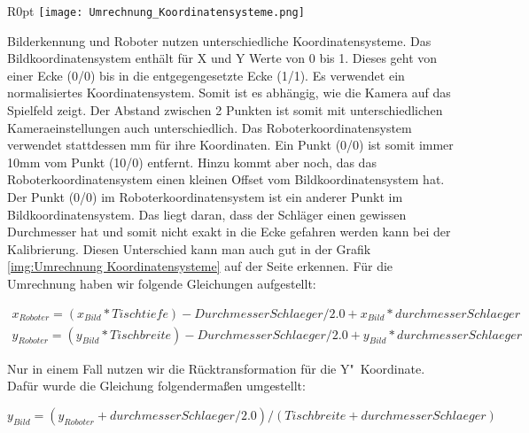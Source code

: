 \begin{wrapfigure}{R}{0pt}
	\vspace{-15pt}
	\texttt{[image: Umrechnung\_Koordinatensysteme.png]}
	\vspace{-15pt}
	\caption{ Veranschaulichung der Koordinatensystemunterschiede}
	\vspace{-15pt}
	\label{img:Umrechnung Koordinatensysteme}
\end{wrapfigure}
Bilderkennung und Roboter nutzen unterschiedliche Koordinatensysteme. Das Bildkoordinatensystem enthält für X und Y Werte von 0 bis 1. Dieses geht von einer Ecke (0/0) bis in die entgegengesetzte Ecke (1/1). Es verwendet ein normalisiertes Koordinatensystem. Somit ist es abhängig, wie die Kamera auf das Spielfeld zeigt. Der Abstand zwischen 2 Punkten ist somit mit unterschiedlichen Kameraeinstellungen auch unterschiedlich. Das Roboterkoordinatensystem verwendet stattdessen mm für ihre Koordinaten. Ein Punkt (0/0) ist somit immer 10mm vom Punkt (10/0) entfernt. Hinzu kommt aber noch, das das Roboterkoordinatensystem einen kleinen Offset vom Bildkoordinatensystem hat. Der Punkt (0/0) im Roboterkoordinatensystem ist ein anderer Punkt im Bildkoordinatensystem. Das liegt daran, dass der Schläger einen gewissen Durchmesser hat und somit nicht exakt in die Ecke gefahren werden kann bei der Kalibrierung. Diesen Unterschied kann man auch gut in der Grafik \ref{img:Umrechnung Koordinatensysteme} auf der Seite \pageref{img:Umrechnung Koordinatensysteme} erkennen. Für die Umrechnung haben wir folgende Gleichungen aufgestellt:

$
\begin{array}{c}
x_{Roboter} = (x_{Bild} * Tischtiefe) - Durchmesser Schlaeger / 2.0 + x_{Bild} * durchmesserSchlaeger \\
y_{Roboter} = (y_{Bild} * Tischbreite) - Durchmesser Schlaeger / 2.0 + y_{Bild} * durchmesserSchlaeger
\end{array}
$

Nur in einem Fall nutzen wir die Rücktransformation für die Y"~Koordinate. Dafür wurde die Gleichung folgendermaßen umgestellt:

$y_{Bild} = (y_{Roboter} + durchmesserSchlaeger / 2.0) / (Tischbreite +  durchmesserSchlaeger)$ 